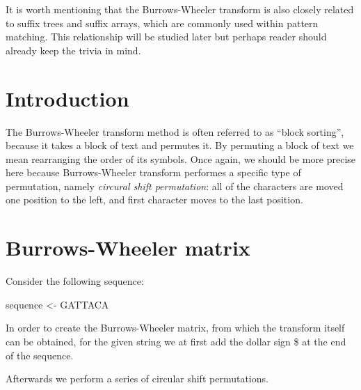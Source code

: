 \documentclass[
]{book}
\newenvironment{Shaded}{\begin{snugshade}}{\end{snugshade}}
\newcommand{\FunctionTok}[1]{\textcolor[rgb]{0.00,0.00,0.00}{#1}}
\newcommand{\NormalTok}[1]{#1}
\newcommand{\OtherTok}[1]{\textcolor[rgb]{0.56,0.35,0.01}{#1}}
\newcommand{\StringTok}[1]{\textcolor[rgb]{0.31,0.60,0.02}{#1}}
\begin{document}
It is worth mentioning that the Burrows-Wheeler transform is also closely related to suffix trees and suffix arrays, which are commonly used within pattern matching. This relationship will be studied later but perhaps reader should already keep the trivia in mind. \citep{bw1}

\hypertarget{introduction-1}{%
\section{Introduction}\label{introduction-1}}

The Burrows-Wheeler transform method is often referred to as ``block sorting'', because it takes a block of text and permutes it. By permuting a block of text we mean rearranging the order of its symbols. Once again, we should be more precise here because Burrows-Wheeler transform performes a specific type of permutation, namely \emph{circural shift permutation}: all of the characters are moved one position to the left, and first character moves to the last position.

\hypertarget{burrows-wheeler-matrix}{%
\section{Burrows-Wheeler matrix}\label{burrows-wheeler-matrix}}

Consider the following sequence:

\begin{Shaded}
\begin{Highlighting}[numbers=left,,]
\NormalTok{sequence }\OtherTok{\textless{}{-}} \StringTok{\textquotesingle{}GATTACA\textquotesingle{}}
\end{Highlighting}
\end{Shaded}

In order to create the Burrows-Wheeler matrix, from which the transform itself can be obtained, for the given string we at first add the dollar sign \$ at the end of the sequence.

\begin{Shaded}
\end{Shaded}

Afterwards we perform a series of circular shift permutations.
\end{document}
